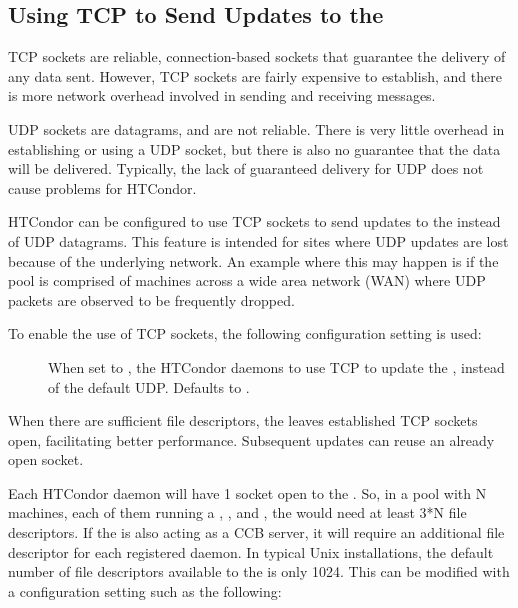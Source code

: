 \subsection{\label{sec:tcp-collector-update}Using TCP to Send Updates to
the }


TCP sockets are reliable, connection-based sockets that guarantee
the delivery of any data sent.
However, TCP sockets are fairly expensive to establish, and there is more
network overhead involved in sending and receiving messages.

UDP sockets are datagrams, and are not reliable.
There is very little overhead in establishing or using a UDP socket,
but there is also no guarantee that the data will be delivered.
Typically, the lack of guaranteed delivery for UDP does not cause
problems for HTCondor.

HTCondor can be configured to use TCP
sockets to send updates to the  instead of
UDP datagrams.
This feature is intended for sites where UDP updates are
lost because of the underlying network.
An example where this may happen is if the pool is comprised of
machines across a wide area network (WAN) where UDP packets are
observed to be frequently dropped.

To enable the use of TCP sockets, the following configuration
setting is used:

\begin{description}

\item[]
  When set to , the HTCondor daemons to use TCP to
  update the , instead of the default UDP.
  Defaults to .

\end{description}

When there are sufficient file descriptors, the  leaves
established TCP sockets open, facilitating better performance.
Subsequent updates can reuse an already open socket.

Each HTCondor daemon will have 1 socket open to the .
So, in a pool with N machines, each of them running a ,
, and , the  would
need at least 3*N file descriptors.  If the  is also
acting as a CCB server, it will require an additional file descriptor for
each registered daemon.  In typical Unix installations,
the default number of file descriptors available to the 
 is only 1024.
  This can be modified with a configuration setting such as the following:

